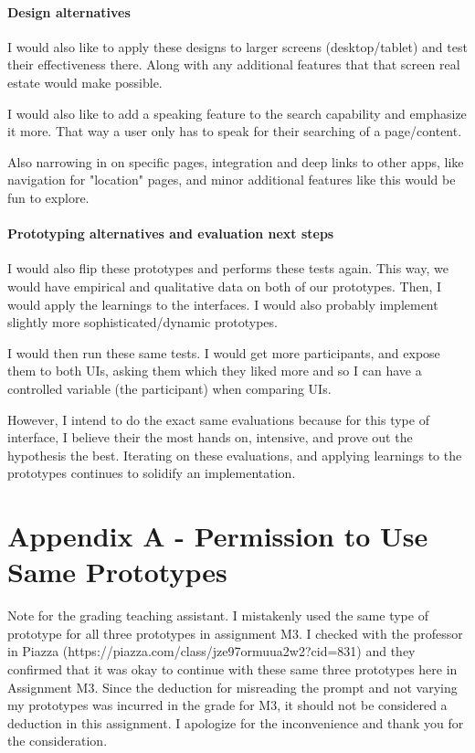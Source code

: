 \paragraph{Design alternatives}
I would also like to apply these designs to larger screens (desktop/tablet) and test their effectiveness there. Along with any additional features that that screen real estate would make possible.

I would also like to add a speaking feature to the search capability and emphasize it more. That way a user only has to speak for their searching of a page/content.

Also narrowing in on specific pages, integration and deep links to other apps, like navigation for "location" pages, and minor additional features like this would be fun to explore.

\paragraph{Prototyping alternatives and evaluation next steps}
I would also flip these prototypes and performs these tests again. This way, we would have empirical and qualitative data on both of our prototypes. Then, I would apply the learnings to the interfaces. I would also probably implement slightly more sophisticated/dynamic prototypes.

I would then run these same tests. I would get more participants, and expose them to both UIs, asking them which they liked more and so I can have a controlled variable (the participant) when comparing UIs.

However, I intend to do the exact same evaluations because for this type of interface, I believe their the most hands on, intensive, and prove out the hypothesis the best. Iterating on these evaluations, and applying learnings to the prototypes continues to solidify an implementation.

\clearpage

\section{Appendix A - Permission to Use Same Prototypes}

Note for the grading teaching assistant. I mistakenly used the same type of prototype for all three prototypes in assignment M3. I checked with the professor in Piazza (https://piazza.com/class/jze97ormuua2w2?cid=831) and they confirmed that it was okay to continue with these same three prototypes here in Assignment M3. Since the deduction for misreading the prompt and not varying my prototypes was incurred in the grade for M3, it should not be considered a deduction in this assignment. I apologize for the inconvenience and thank you for the consideration.

